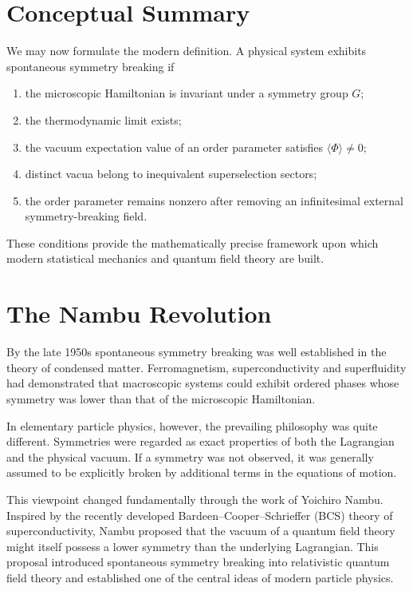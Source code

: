 \section{Conceptual Summary}
We may now formulate the modern definition.
A physical system exhibits spontaneous symmetry breaking if
\begin{enumerate}
\item the microscopic Hamiltonian is invariant under a symmetry group
      \(G\);
\item the thermodynamic limit exists;
\item the vacuum expectation value of an order parameter satisfies
$\langle\Phi\rangle \neq 0;$
\item distinct vacua belong to inequivalent superselection sectors;
\item the order parameter remains nonzero after removing an
infinitesimal external symmetry-breaking field.
\end{enumerate}
These conditions provide the mathematically precise framework upon which
modern statistical mechanics and quantum field theory are built.

\section{The Nambu Revolution}
\label{sec:nambu}
By the late 1950s spontaneous symmetry breaking was well established in
the theory of condensed matter. Ferromagnetism, superconductivity and
superfluidity had demonstrated that macroscopic systems could exhibit
ordered phases whose symmetry was lower than that of the microscopic
Hamiltonian.

In elementary particle physics, however, the prevailing philosophy was
quite different. Symmetries were regarded as exact properties of both
the Lagrangian and the physical vacuum. If a symmetry was not observed,
it was generally assumed to be explicitly broken by additional terms in
the equations of motion.

This viewpoint changed fundamentally through the work of Yoichiro Nambu.
Inspired by the recently developed Bardeen--Cooper--Schrieffer (BCS)
theory of superconductivity, Nambu proposed that the vacuum of a quantum
field theory might itself possess a lower symmetry than the underlying
Lagrangian. This proposal introduced spontaneous symmetry breaking into
relativistic quantum field theory and established one of the central
ideas of modern particle physics.

